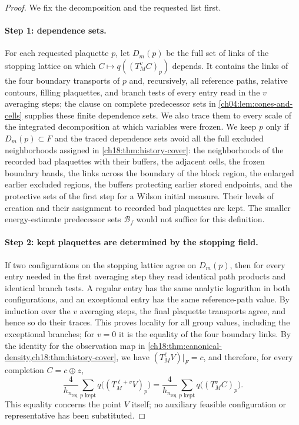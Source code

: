 \begin{proof}
We fix the decomposition and the requested list first.

\paragraph{Step 1: dependence sets.}
For each requested plaquette $p$, let $D_m(p)$ be the full set of links of the stopping lattice on which $C\mapsto q((T_M^vC)_p)$ depends. It contains the links of the four boundary transports of $p$ and, recursively, all reference paths, relative contours, filling plaquettes, and branch tests of every entry read in the $v$ averaging steps; the clause on complete predecessor sets in \cref{ch04:lem:cones-and-cells} supplies these finite dependence sets. We also trace them to every scale of the integrated decomposition at which variables were frozen. We keep $p$ only if $D_m(p)\subset F$ and the traced dependence sets avoid all the full excluded neighborhoods assigned in \cref{ch18:thm:history-cover}: the neighborhoods of the recorded bad plaquettes with their buffers, the adjacent cells, the frozen boundary bands, the links across the boundary of the block region, the enlarged earlier excluded regions, the buffers protecting earlier stored endpoints, and the protective sets of the first step for a Wilson initial measure. Their levels of creation and their assignment to recorded bad plaquettes are kept. The smaller energy-estimate predecessor sets $\mathcal B_f$ would not suffice for this definition.

\paragraph{Step 2: kept plaquettes are determined by the stopping field.}
If two configurations on the stopping lattice agree on $D_m(p)$, then for every entry needed in the first averaging step they read identical path products and identical branch tests. A regular entry has the same analytic logarithm in both configurations, and an exceptional entry has the same reference-path value. By induction over the $v$ averaging steps, the final plaquette transports agree, and hence so do their traces. This proves locality for all group values, including the exceptional branches; for $v=0$ it is the equality of the four boundary links. By the identity for the observation map in \cref{ch18:thm:canonical-density,ch18:thm:history-cover}, we have $(T_M^\ell V)|_F=c$, and therefore, for every completion $C=c\oplus z$,
\[
 \frac4{h_{n_{\mathrm{req}}}}\sum_{p\text{ kept}}q\bigl((T_M^{\ell+v}V)_p\bigr)
 =\frac4{h_{n_{\mathrm{req}}}}\sum_{p\text{ kept}}q\bigl((T_M^vC)_p\bigr).
\]
This equality concerns the point $V$ itself; no auxiliary feasible configuration or representative has been substituted.


\end{proof}
